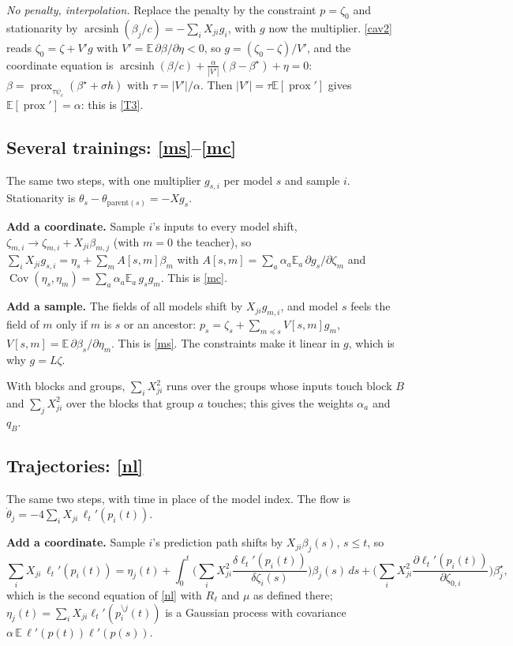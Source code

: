 \documentclass[10pt]{article}
\newcommand{\bs}{\beta^\star}\newcommand{\E}{\mathbb E}\newcommand{\asinh}{\operatorname{arcsinh}}\newcommand{\prox}{\operatorname{prox}}
\begin{document}
\emph{No penalty, interpolation.} Replace the penalty by the constraint $p=\zeta_0$ and stationarity by $\asinh(\beta_j/c)=-\sum_iX_{ji}g_i$, with $g$ now the multiplier. \eqref{cav2} reads $\zeta_0=\zeta+V'g$ with $V'=\E\,\partial\beta/\partial\eta<0$, so $g=(\zeta_0-\zeta)/V'$, and the coordinate equation is $\asinh(\beta/c)+\frac{\alpha}{|V'|}(\beta-\bs)+\eta=0$: $\beta=\prox_{\tau\psi_c}(\bs+\sigma h)$ with $\tau=|V'|/\alpha$. Then $|V'|=\tau\E[\prox{}']$ gives $\E[\prox{}']=\alpha$: this is \eqref{T3}.

\subsection{Several trainings: \eqref{ms}--\eqref{mc}}
The same two steps, with one multiplier $g_{s,i}$ per model $s$ and sample $i$. Stationarity is $\theta_s-\theta_{\text{parent}(s)}=-Xg_s$.

\textbf{Add a coordinate.} Sample $i$'s inputs to every model shift, $\zeta_{m,i}\to\zeta_{m,i}+X_{ji}\beta_{m,j}$ (with $m=0$ the teacher), so $\sum_iX_{ji}g_{s,i}=\eta_{s}+\sum_mA[s,m]\beta_m$ with $A[s,m]=\sum_a\alpha_a\E_a\,\partial g_s/\partial\zeta_m$ and $\operatorname{Cov}(\eta_s,\eta_m)=\sum_a\alpha_a\E_a\,g_sg_m$. This is \eqref{mc}.

\textbf{Add a sample.} The fields of all models shift by $X_{ji}g_{m,i}$, and model $s$ feels the field of $m$ only if $m$ is $s$ or an ancestor: $p_s=\zeta_s+\sum_{m\preceq s}V[s,m]g_m$, $V[s,m]=\E\,\partial\beta_s/\partial\eta_m$. This is \eqref{ms}. The constraints make it linear in $g$, which is why $g=L\zeta$.

With blocks and groups, $\sum_iX_{ji}^2$ runs over the groups whose inputs touch block $B$ and $\sum_jX_{ji}^2$ over the blocks that group $a$ touches; this gives the weights $\alpha_a$ and $q_B$.

\subsection{Trajectories: \eqref{nl}}
The same two steps, with time in place of the model index. The flow is $\dot\theta_j=-4\sum_iX_{ji}\,\ell_t'(p_i(t))$.

\textbf{Add a coordinate.} Sample $i$'s prediction path shifts by $X_{ji}\beta_j(s)$, $s\le t$, so
\[
\sum_iX_{ji}\,\ell_t'(p_i(t))=\eta_j(t)+\int_0^t\Big(\sum_iX_{ji}^2\frac{\delta\ell_t'(p_i(t))}{\delta\zeta_i(s)}\Big)\beta_j(s)\,ds+\Big(\sum_iX_{ji}^2\frac{\partial\ell_t'(p_i(t))}{\partial\zeta_{0,i}}\Big)\bs_j ,
\]
which is the second equation of \eqref{nl} with $R_\ell$ and $\mu$ as defined there; $\eta_j(t)=\sum_iX_{ji}\ell_t'(p_i^{\setminus j}(t))$ is a Gaussian process with covariance $\alpha\,\E\,\ell'(p(t))\ell'(p(s))$.
\end{document}
